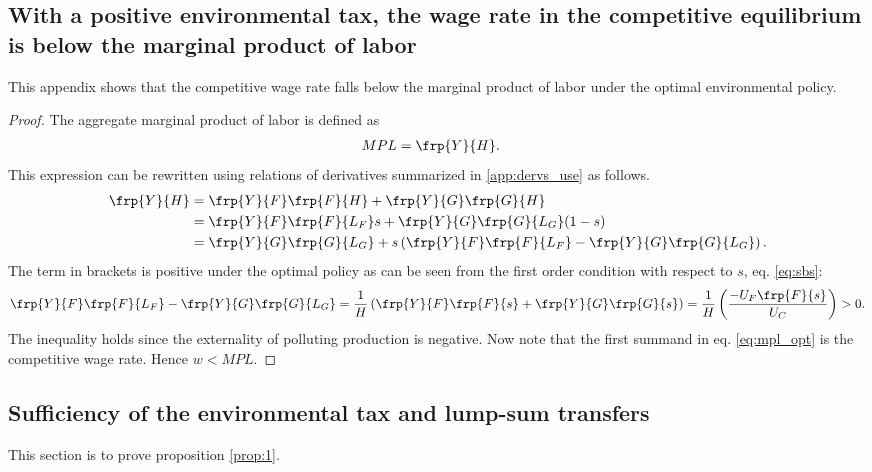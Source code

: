 \subsection{With a positive environmental tax, the wage rate in the competitive equilibrium is below the marginal product of labor}\label{app:wageMPL}
This appendix shows that the competitive wage rate falls below the marginal product of labor under the optimal environmental policy. 
\begin{proof}
The aggregate marginal product of labor is defined as
\begin{align}
MPL&= \frp{Y}{H}.\nonumber
\end{align}
This expression can be rewritten using relations of derivatives summarized in \ref{app:dervs_use} as follows.
\begin{align}
 \frp{Y}{H}&= \frp{Y}{F}\frp{F}{H}+\frp{Y}{G}\frp{G}{H}\nonumber\\
&= \frp{Y}{F}\frp{F}{L_F}s+\frp{Y}{G}\frp{G}{L_G}(1-s)\nonumber\\
&= \frp{Y}{G}\frp{G}{L_G}+ s\left(\frp{Y}{F}\frp{F}{L_F}-\frp{Y}{G}\frp{G}{L_G}\right).\label{eq:mpl_opt}
\end{align}
The term in brackets is positive under the optimal policy as can be seen from the first order condition with respect to $s$, eq. \eqref{eq:sbs}:
\begin{align}
\frp{Y}{F}\frp{F}{L_F}-\frp{Y}{G}\frp{G}{L_G}=\frac{1}{H}\left(\frp{Y}{F}\frp{F}{s}+\frp{Y}{G}\frp{G}{s}\right)=\frac{1}{H}\left(\frac{-U_F\frp{F}{s}}{U_C}\right)>0.\label{eq:gap}
\end{align}
The inequality holds since the externality of polluting production is negative. %
Now note that the first summand in eq. \eqref{eq:mpl_opt} is the competitive wage rate.  Hence $w<MPL$.

\end{proof}
\subsection{Sufficiency of the environmental tax and lump-sum transfers}\label{app:incometax0}
This section is to prove proposition \ref{prop:1}.


